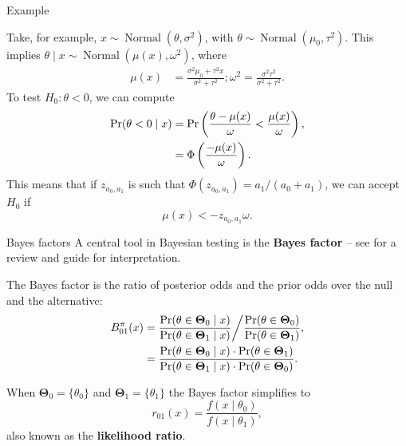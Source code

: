 \begin{frame}{Example}
\begin{example}
  Take, for example, $x \sim \operatorname{Normal}(\theta, \sigma^2)$, with $\theta \sim \operatorname{Normal}(\mu_0, \tau^2)$.
This implies $\theta \mid x \sim \operatorname{Normal}(\mu(x), \omega^2)$, where
\begin{align*}
 \mu(x) &= \frac{\sigma^2\mu_0 + \tau^2x}{\sigma^2 + \tau^2};
 \omega^2 = \frac{\sigma^2\tau^2}{\sigma^2 + \tau^2}.
\end{align*}
To test $H_0: \theta < 0$, we can compute
\begin{align*}
 \operatorname{Pr}(\theta < 0 \mid x) &= \operatorname{Pr} \left(\frac{\theta-\mu(x)}{\omega} < \frac{\mu(x)}{\omega}\right), \\
 &= \Phi\left(\frac{-\mu(x)}{\omega}\right).
\end{align*}
This means that if $z_{a_0, a_1}$ is such that $\Phi(z_{a_0, a_1}) = a_1/(a_0 + a_1)$, we can accept $H_0$ if 
$$\mu(x) < -z_{a_0, a_1}\omega. $$
\end{example}
\end{frame}
\begin{frame}{Bayes factors}
A central tool in Bayesian testing is the \textbf{Bayes factor} -- see \cite{Kass1995} for a review and guide for interpretation.
\begin{defn}
 \label{def:Bayes_factor}
 The Bayes factor is the ratio of posterior odds and the prior odds over the null and the alternative:
 \begin{align*}
  B^\pi_{01}(x) &= \frac{\operatorname{Pr}(\theta \in\boldsymbol{\Theta}_0 \mid x)}{\operatorname{Pr}(\theta \in\boldsymbol{\Theta}_1 \mid x)}\bigg/\frac{\operatorname{Pr}(\theta \in\boldsymbol{\Theta}_0)}{\operatorname{Pr}(\theta \in\boldsymbol{\Theta}_1)},\\
  &= \frac{\operatorname{Pr}(\theta \in\boldsymbol{\Theta}_0 \mid x)\cdot\operatorname{Pr}(\theta \in\boldsymbol{\Theta}_1)}{\operatorname{Pr}(\theta \in\boldsymbol{\Theta}_1 \mid x)\cdot\operatorname{Pr}(\theta \in\boldsymbol{\Theta}_0)}.
 \end{align*}
\begin{remark}
 When $\boldsymbol{\Theta}_0 = \{\theta_0\}$ and  $\boldsymbol{\Theta}_1 = \{\theta_1\}$ the Bayes factor simplifies to
 \begin{equation*}
  r_{01}(x) = \frac{f(x\mid\theta_0)}{f(x\mid\theta_1)},
 \end{equation*}
 also known as the \textbf{likelihood ratio}.
\end{remark}
\end{defn}
\end{frame}
